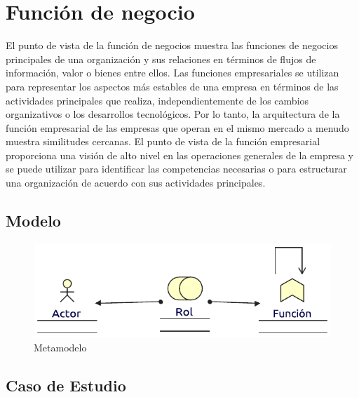 \section{Función de negocio}
El punto de vista de la función de negocios muestra las funciones de negocios principales de una organización y sus relaciones en términos de flujos de información, valor o bienes entre ellos. Las funciones empresariales se utilizan para representar los aspectos más estables de una empresa en términos de las actividades principales que realiza, independientemente de los cambios organizativos o los desarrollos tecnológicos. Por lo tanto, la arquitectura de la función empresarial de las empresas que operan en el mismo mercado a menudo muestra similitudes cercanas. El punto de vista de la función empresarial proporciona una visión de alto nivel en las operaciones generales de la empresa y se puede utilizar para identificar las competencias necesarias o para estructurar una organización de acuerdo con sus actividades principales.
\subsection{Modelo}
\begin{figure}[h!]
	\centering
	\includegraphics[width=0.8\linewidth]{Arquitectura/Negocio/imgs/FuncionNegocioMetamodelo.pdf}
	\caption{Metamodelo}
\end{figure}
\newpage
\subsection{Caso de Estudio}

